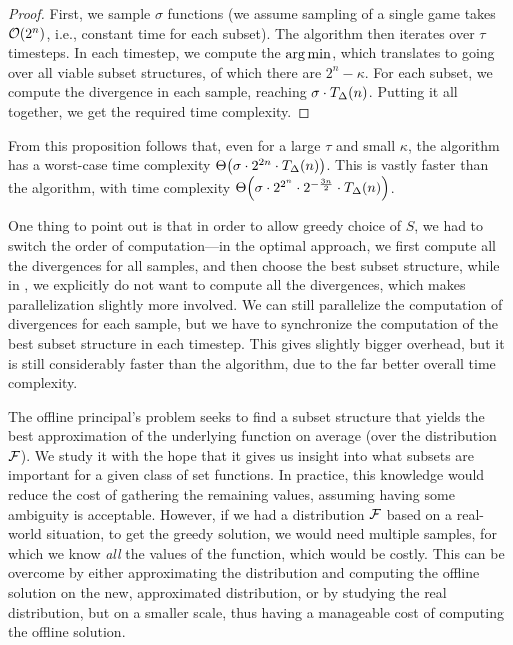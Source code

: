 \begin{proof}
  First, we sample $ \sigma $ functions (we assume sampling of a single game takes $ \mathcal{O}\!\left(2^n\right) $, i.e., constant time for each subset).
  The algorithm then iterates over $ \tau $ timesteps. 
  In each timestep, we compute the  $\operatorname*{arg\,min}$, which translates to going over all viable subset structures, of which there are $ 2^n-\kappa $.
  For each subset, we compute the divergence in each sample, reaching $ \sigma \cdot T_\Delta\!\left(n\right) $.
  Putting it all together, we get the required time complexity.
\end{proof}

From this proposition follows that, even for a large $ \tau $ and small $ \kappa $, the \algFG{} algorithm has a worst-case time complexity $ \Theta\!\left(\sigma \cdot 2^{2n} \cdot T_\Delta\!\left(n\right)\right) $.
This is vastly faster than the \algFO{} algorithm, with time complexity $ \Theta\!\left(\sigma \cdot 2^{2^n} \cdot 2^{-\frac{3n}{2}}\cdot T_\Delta\!\left(n\right)\right) $.

One thing to point out is that in order to allow greedy choice of $ S $, we had to switch the order of computation---in the optimal approach, we first compute all the divergences for all samples, and then choose the best subset structure, while in \algFG{}, we explicitly do not want to compute all the divergences, which makes parallelization slightly more involved.
We can still parallelize the computation of divergences for each sample, but we have to synchronize the computation of the best subset structure in each timestep.
This gives slightly bigger overhead, but it is still considerably faster than the \algFO{} algorithm, due to the far better overall time complexity.

The offline principal's problem seeks to find a subset structure that yields the best approximation of the underlying function on average (over the distribution $ \mathcal{F} $).
We study it with the hope that it gives us insight into what subsets are important for a given class of set functions.
In practice, this knowledge would reduce the cost of gathering the remaining values, assuming having some ambiguity is acceptable.
However, if we had a distribution $ \mathcal{F} $ based on a real-world situation, to get the greedy solution, we would need multiple samples, for which we know \emph{all} the values of the function, which would be costly.
This can be overcome by either approximating the distribution and computing the offline solution on the new, approximated distribution, or by studying the real distribution, but on a smaller scale, thus having a manageable cost of computing the offline solution.


